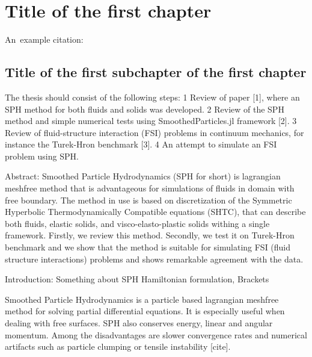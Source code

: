 \chapter{Title of the first chapter}

An~example citation: \cite{Andel07}

\section{Title of the first subchapter of the first chapter}
The thesis should consist of the following steps:
1 Review of paper [1], where an SPH method for both fluids and solids was developed.
2 Review of the SPH method and simple numerical tests using SmoothedParticles.jl framework [2].
3 Review of fluid-structure interaction (FSI) problems in continuum mechanics, for instance the Turek-Hron benchmark [3].
4 An attempt to simulate an FSI problem using SPH.


Abstract:
Smoothed Particle Hydrodynamics (SPH for short) is lagrangian meshfree method that is advantageous 
for simulations of fluids in domain with free boundary. The method in use is based on discretization
of the Symmetric Hyperbolic Thermodynamically Compatible equations (SHTC), that can describe both fluids, elastic solids,
and visco-elasto-plastic solids withing a single framework. Firstly, we review this method. Secondly, we test it on Turek-Hron benchmark and we show that
the method is suitable for simulating FSI (fluid structure interactions) problems and shows remarkable agreement with the data.

Introduction:
Something about SPH
Hamiltonian formulation, Brackets

Smoothed Particle Hydrodynamics is a particle based lagrangian meshfree method for solving partial differential equations. 
It is especially useful when dealing with free surfaces. SPH also conserves energy, linear and angular momentum. 
Among the disadvantages are slower convergence rates and numerical artifacts such as particle clumping or tensile instability [cite].


